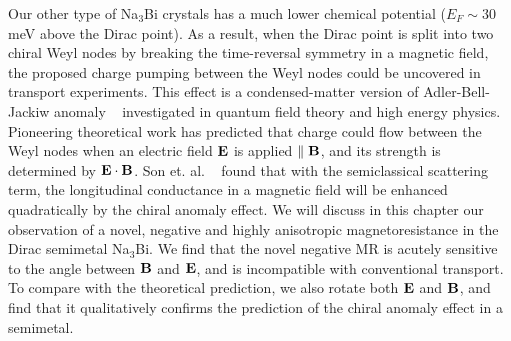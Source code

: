 Our other type of Na$_3$Bi crystals has a much lower chemical potential ($E_F \sim 30$ meV above the Dirac point). As a result, when the Dirac point is split into two chiral Weyl nodes by breaking the time-reversal symmetry in a magnetic field, the proposed charge pumping between the Weyl nodes could be uncovered in transport experiments\cite{Xiong2015b}. This effect is a condensed-matter version of Adler-Bell-Jackiw anomaly ~\cite{Nielsen1983,Wan2011,Burkov2011, Hosur2013} investigated in quantum field theory and high energy physics. Pioneering theoretical work has predicted that charge could flow between the Weyl nodes when an electric field $\bf E$ is applied $\parallel \bf B$, and its strength is determined by $\bf E\cdot \bf B$. Son et. al. ~\cite{Hosur2013} found that with the semiclassical scattering term, the longitudinal conductance in a magnetic field will be enhanced quadratically by the chiral anomaly effect. We will discuss in this chapter our observation of a novel, negative and highly anisotropic magnetoresistance in the Dirac semimetal Na$_3$Bi. We find that the novel negative MR is acutely sensitive to the angle between $\bf B$ and $\bf E$, and is incompatible with conventional transport. To compare with the theoretical prediction, we also rotate both $\bf E$ and $\bf B$, and find that it qualitatively confirms the prediction of the chiral anomaly effect in a semimetal. 







